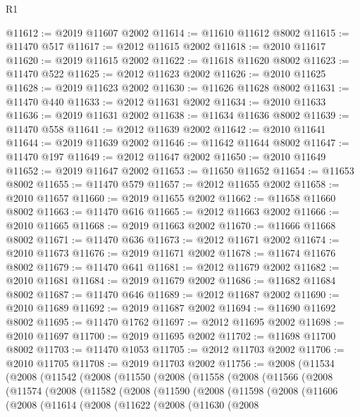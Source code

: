 \begin{lexlean}{R1}
\begin{coremodule}
@11612 := @2019 @11607 @2002
@11614 := @11610 @11612 @8002
@11615 := @11470 @517
@11617 := @2012 @11615 @2002
@11618 := @2010 @11617
@11620 := @2019 @11615 @2002
@11622 := @11618 @11620 @8002
@11623 := @11470 @522
@11625 := @2012 @11623 @2002
@11626 := @2010 @11625
@11628 := @2019 @11623 @2002
@11630 := @11626 @11628 @8002
@11631 := @11470 @440
@11633 := @2012 @11631 @2002
@11634 := @2010 @11633
@11636 := @2019 @11631 @2002
@11638 := @11634 @11636 @8002
@11639 := @11470 @558
@11641 := @2012 @11639 @2002
@11642 := @2010 @11641
@11644 := @2019 @11639 @2002
@11646 := @11642 @11644 @8002
@11647 := @11470 @197
@11649 := @2012 @11647 @2002
@11650 := @2010 @11649
@11652 := @2019 @11647 @2002
@11653 := @11650 @11652
@11654 := @11653 @8002
@11655 := @11470 @579
@11657 := @2012 @11655 @2002
@11658 := @2010 @11657
@11660 := @2019 @11655 @2002
@11662 := @11658 @11660 @8002
@11663 := @11470 @616
@11665 := @2012 @11663 @2002
@11666 := @2010 @11665
@11668 := @2019 @11663 @2002
@11670 := @11666 @11668 @8002
@11671 := @11470 @636
@11673 := @2012 @11671 @2002
@11674 := @2010 @11673
@11676 := @2019 @11671 @2002
@11678 := @11674 @11676 @8002
@11679 := @11470 @641
@11681 := @2012 @11679 @2002
@11682 := @2010 @11681
@11684 := @2019 @11679 @2002
@11686 := @11682 @11684 @8002
@11687 := @11470 @646
@11689 := @2012 @11687 @2002
@11690 := @2010 @11689
@11692 := @2019 @11687 @2002
@11694 := @11690 @11692 @8002
@11695 := @11470 @1762
@11697 := @2012 @11695 @2002
@11698 := @2010 @11697
@11700 := @2019 @11695 @2002
@11702 := @11698 @11700 @8002
@11703 := @11470 @1053
@11705 := @2012 @11703 @2002
@11706 := @2010 @11705
@11708 := @2019 @11703 @2002
@11756 := @2008
    (@11534
      (@2008
        (@11542
          (@2008
            (@11550
              (@2008
                (@11558
                  (@2008
                    (@11566
                      (@2008
                        (@11574
                          (@2008
                            (@11582
                              (@2008
                                (@11590
                                  (@2008
                                    (@11598
                                      (@2008
                                        (@11606
                                          (@2008
                                            (@11614
                                              (@2008
                                                (@11622
                                                  (@2008
                                                    (@11630
                                                      (@2008

\end{coremodule}
\end{lexlean}
